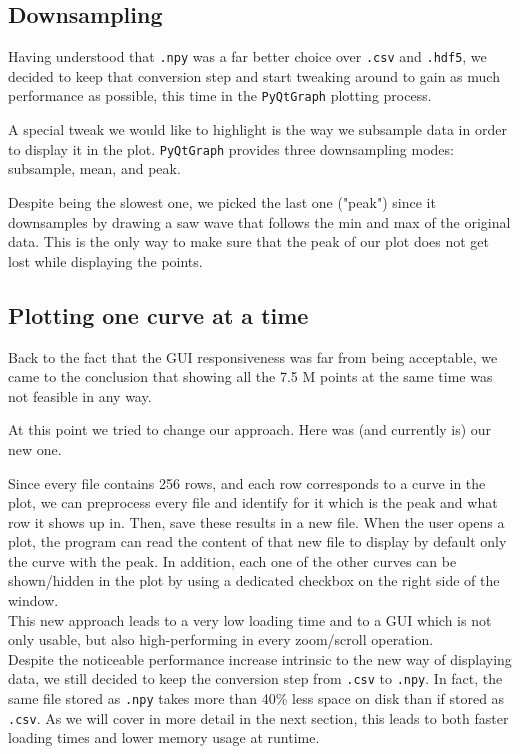 \documentclass[11pt,a4paper]{article}
\begin{document}
\subsection{Downsampling}

Having understood that \texttt{.npy} was a far better choice over \texttt{.csv} and \texttt{.hdf5}, we decided to keep that conversion step and start tweaking around to gain as much performance as possible, this time in the \texttt{PyQtGraph} plotting process.

A special tweak we would like to highlight is the way we subsample data in order to display it in the plot.
\texttt{PyQtGraph} provides three downsampling modes: subsample, mean, and peak.

Despite being the slowest one, we picked the last one ("peak") since it downsamples by drawing a saw wave that follows the min and max of the original data.
This is the only way to make sure that the peak of our plot does not get lost while displaying the points.\\

\subsection{Plotting one curve at a time}

Back to the fact that the GUI responsiveness was far from being acceptable, we came to the conclusion that showing all the 7.5 M points at the same time was not feasible in any way.

At this point we tried to change our approach. Here was (and currently is) our new one.

Since every file contains 256 rows, and each row corresponds to a curve in the plot, we can preprocess every file and identify for it which is the peak and what row it shows up in. Then, save these results in a new file.
When the user opens a plot, the program can read the content of that new file to display by default only the curve with the peak.
In addition, each one of the other curves can be shown/hidden in the plot by using a dedicated checkbox on the right side of the window.\\

This new approach leads to a very low loading time and to a GUI which is not only usable, but also high-performing in every zoom/scroll operation.\\

Despite the noticeable performance increase intrinsic to the new way of displaying data, we still decided to keep the conversion step from \texttt{.csv} to \texttt{.npy}.
In fact, the same file stored as \texttt{.npy} takes more than 40\% less space on disk than if stored as \texttt{.csv}.
As we will cover in more detail in the next section, this leads to both faster loading times and lower memory usage at runtime.
\end{document}
